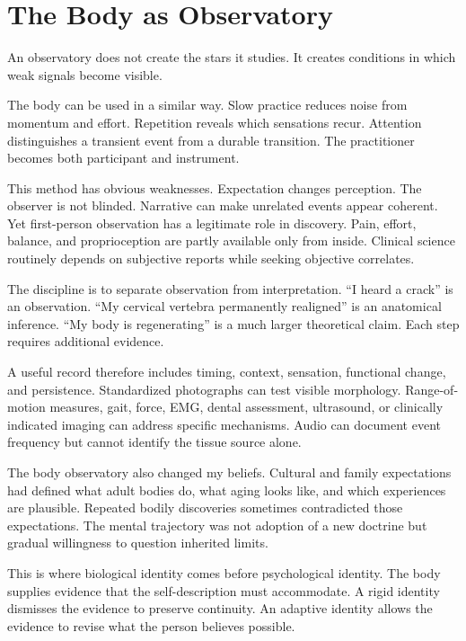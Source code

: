 \chapter{The Body as Observatory}\label{chapter-14-the-body-as-observatory}

An observatory does not create the stars it studies. It creates conditions in which weak signals become visible.

The body can be used in a similar way. Slow practice reduces noise from momentum and effort. Repetition reveals which sensations recur. Attention distinguishes a transient event from a durable transition. The practitioner becomes both participant and instrument.

This method has obvious weaknesses. Expectation changes perception. The observer is not blinded. Narrative can make unrelated events appear coherent. Yet first-person observation has a legitimate role in discovery. Pain, effort, balance, and proprioception are partly available only from inside. Clinical science routinely depends on subjective reports while seeking objective correlates.

The discipline is to separate observation from interpretation. ``I heard a crack'' is an observation. ``My cervical vertebra permanently realigned'' is an anatomical inference. ``My body is regenerating'' is a much larger theoretical claim. Each step requires additional evidence.

A useful record therefore includes timing, context, sensation, functional change, and persistence. Standardized photographs can test visible morphology. Range-of-motion measures, gait, force, EMG, dental assessment, ultrasound, or clinically indicated imaging can address specific mechanisms. Audio can document event frequency but cannot identify the tissue source alone.

The body observatory also changed my beliefs. Cultural and family expectations had defined what adult bodies do, what aging looks like, and which experiences are plausible. Repeated bodily discoveries sometimes contradicted those expectations. The mental trajectory was not adoption of a new doctrine but gradual willingness to question inherited limits.

This is where biological identity comes before psychological identity. The body supplies evidence that the self-description must accommodate. A rigid identity dismisses the evidence to preserve continuity. An adaptive identity allows the evidence to revise what the person believes possible.

